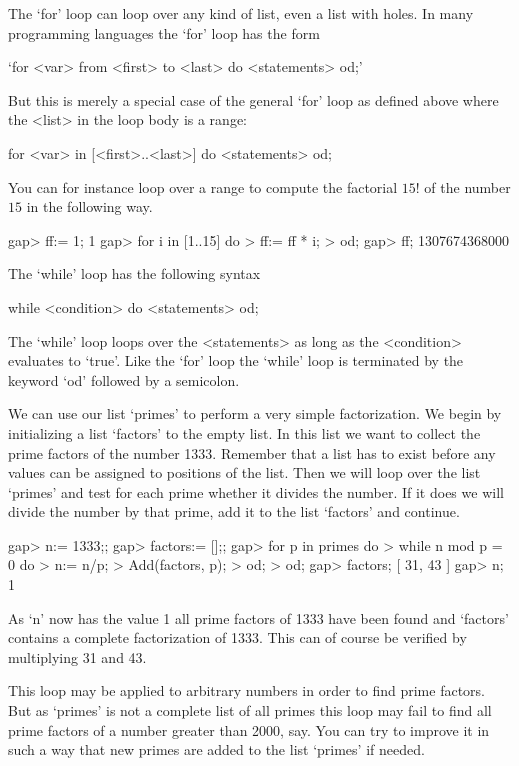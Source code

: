 The `for' loop can loop over any kind of list, even a list with holes.
In many programming languages the `for' loop has the form

`for <var> from <first> to <last> do <statements> od;'

But this is merely a special case of the general `for' loop as defined
above where the <list> in the loop body is a range:

\)\fmark for <var> in [<first>..<last>] do <statements>  od;

You can for  instance loop over a range to compute the factorial $15!$
of the number $15$ in the following way.

\beginexample
gap> ff:= 1;
1
gap> for i in [1..15] do
>       ff:= ff * i;
>    od;
gap> ff;
1307674368000
\endexample

The  `while' loop has the following syntax

\)\fmark while <condition> do <statements>  od; 

The `while'  loop loops over the <statements>  as long as  the 
<condition> evaluates  to  `true'. Like the `for' loop the `while' loop 
is terminated by the keyword `od' followed by a semicolon.

We can use  our list `primes' to perform a very simple factorization.  We
begin by  initializing a list `factors' to the empty list.   In this list
we want to collect the prime factors of the number 1333.  Remember that a
list has to exist  before any values  can be assigned to positions of the
list.  Then we  will loop over the list `primes' and  test for each prime
whether it divides the  number.  If it does we will  divide the number by
that prime, add it to the list `factors' and continue.

\beginexample
gap> n:= 1333;;
gap> factors:= [];;
gap> for p in primes do
>       while n mod p = 0 do
>          n:= n/p;
>          Add(factors, p);
>       od;
>    od;
gap> factors;
[ 31, 43 ]
gap> n;
1
\endexample

As `n' now has the value 1 all prime factors  of 1333 have been found and
`factors' contains a complete factorization of  1333.  This can of course
be verified by multiplying 31 and 43.

This loop  may  be applied  to arbitrary  numbers in order  to find prime
factors.  But  as `primes' is not a complete list of all primes this loop
may fail  to find all prime factors of  a number greater than 2000,  say.
You  can try to improve it in such a way that new primes are added to the
list `primes' if needed.

